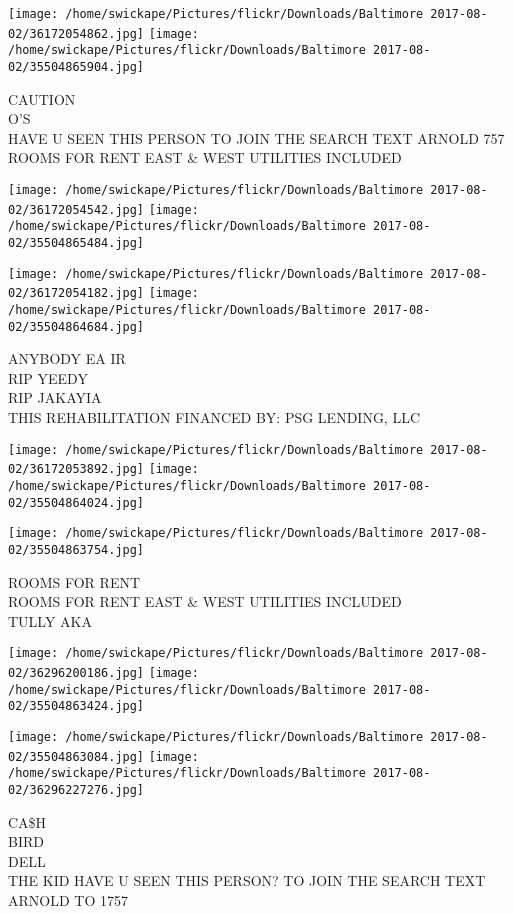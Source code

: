 \documentclass[10pt,letterpaper]{article}
\begin{document}
\texttt{[image: /home/swickape/Pictures/flickr/Downloads/Baltimore 2017-08-02/36172054862.jpg]}
\texttt{[image: /home/swickape/Pictures/flickr/Downloads/Baltimore 2017-08-02/35504865904.jpg]}

CAUTION\\
O'S\\
HAVE U SEEN THIS PERSON TO JOIN THE SEARCH TEXT ARNOLD 757\\
ROOMS FOR RENT EAST \& WEST UTILITIES INCLUDED
\pagebreak

\texttt{[image: /home/swickape/Pictures/flickr/Downloads/Baltimore 2017-08-02/36172054542.jpg]}
\texttt{[image: /home/swickape/Pictures/flickr/Downloads/Baltimore 2017-08-02/35504865484.jpg]}

\texttt{[image: /home/swickape/Pictures/flickr/Downloads/Baltimore 2017-08-02/36172054182.jpg]}
\texttt{[image: /home/swickape/Pictures/flickr/Downloads/Baltimore 2017-08-02/35504864684.jpg]}

ANYBODY EA IR\\
RIP YEEDY\\
RIP JAKAYIA\\
THIS REHABILITATION FINANCED BY: PSG LENDING, LLC
\pagebreak

\texttt{[image: /home/swickape/Pictures/flickr/Downloads/Baltimore 2017-08-02/36172053892.jpg]}
\texttt{[image: /home/swickape/Pictures/flickr/Downloads/Baltimore 2017-08-02/35504864024.jpg]}

\vspace{0.25in}
\texttt{[image: /home/swickape/Pictures/flickr/Downloads/Baltimore 2017-08-02/35504863754.jpg]}

ROOMS FOR RENT\\
ROOMS FOR RENT EAST \& WEST UTILITIES INCLUDED\\
TULLY AKA
\pagebreak

\texttt{[image: /home/swickape/Pictures/flickr/Downloads/Baltimore 2017-08-02/36296200186.jpg]}
\texttt{[image: /home/swickape/Pictures/flickr/Downloads/Baltimore 2017-08-02/35504863424.jpg]}

\texttt{[image: /home/swickape/Pictures/flickr/Downloads/Baltimore 2017-08-02/35504863084.jpg]}
\texttt{[image: /home/swickape/Pictures/flickr/Downloads/Baltimore 2017-08-02/36296227276.jpg]}

CA\$H\\
BIRD\\
DELL\\
THE KID HAVE U SEEN THIS PERSON?  TO JOIN THE SEARCH TEXT ARNOLD TO 1757
\pagebreak
\end{document}
